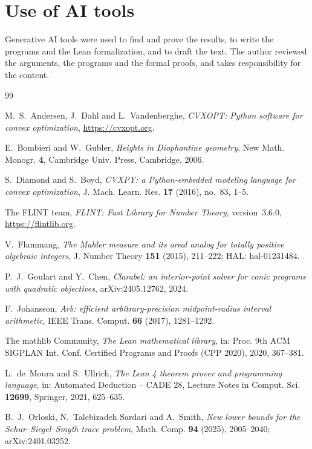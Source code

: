 \documentclass[11pt]{amsart}
\theoremstyle{remark}
\numberwithin{equation}{section}
\begin{document}
\section*{Use of AI tools}
Generative AI tools were used to find and prove the results, to write the programs and the Lean formalization, and to draft the text. The author reviewed the arguments, the programs and the formal proofs, and takes responsibility for the content.

\begin{thebibliography}{99}

 M.~S.~Andersen, J.~Dahl and L.~Vandenberghe, \emph{CVXOPT: Python software for convex optimization}, \url{https://cvxopt.org}.


 E.~Bombieri and W.~Gubler, \emph{Heights in Diophantine geometry}, New Math. Monogr. \textbf{4}, Cambridge Univ. Press, Cambridge, 2006.

 S.~Diamond and S.~Boyd, \emph{CVXPY: a Python-embedded modeling language for convex optimization}, J. Mach. Learn. Res. \textbf{17} (2016), no.~83, 1--5.

 The FLINT team, \emph{FLINT: Fast Library for Number Theory}, version~3.6.0, \url{https://flintlib.org}.

 V.~Flammang, \emph{The Mahler measure and its areal analog for totally positive algebraic integers}, J. Number Theory \textbf{151} (2015), 211--222; HAL: hal-01231484.

 P.~J.~Goulart and Y.~Chen, \emph{Clarabel: an interior-point solver for conic programs with quadratic objectives}, arXiv:2405.12762, 2024.

 F.~Johansson, \emph{Arb: efficient arbitrary-precision midpoint-radius interval arithmetic}, IEEE Trans. Comput. \textbf{66} (2017), 1281--1292.

 The mathlib Community, \emph{The Lean mathematical library}, in: Proc. 9th ACM SIGPLAN Int. Conf. Certified Programs and Proofs (CPP 2020), 2020, 367--381.

 L.~de~Moura and S.~Ullrich, \emph{The Lean 4 theorem prover and programming language}, in: Automated Deduction -- CADE 28, Lecture Notes in Comput. Sci. \textbf{12699}, Springer, 2021, 625--635.

 B.~J.~Orloski, N.~Talebizadeh Sardari and A.~Smith, \emph{New lower bounds for the Schur--Siegel--Smyth trace problem}, Math. Comp. \textbf{94} (2025), 2005--2040; arXiv:2401.03252.


\end{thebibliography}
\end{document}
